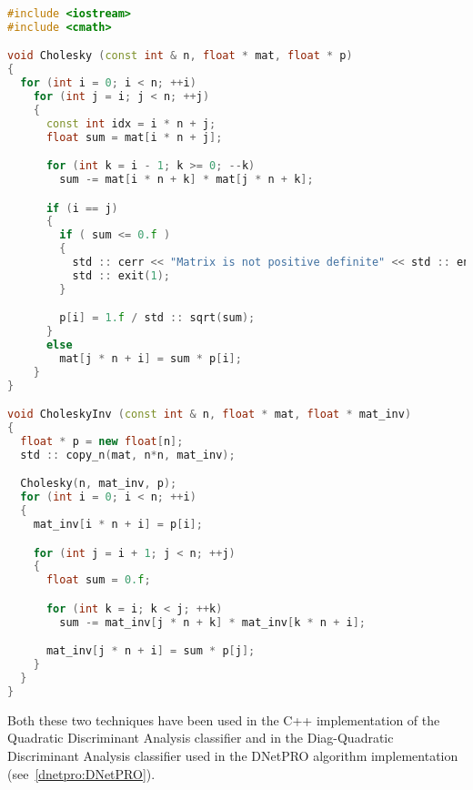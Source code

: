 \documentclass{standalone}
\begin{document}
\lstset{style=c++}
\begin{lstlisting}[language=C++, caption=Cholesky inverse matrix, label=code:cholesky]
#include <iostream>
#include <cmath>

void Cholesky (const int & n, float * mat, float * p)
{
  for (int i = 0; i < n; ++i)
    for (int j = i; j < n; ++j)
    {
      const int idx = i * n + j;
      float sum = mat[i * n + j];

      for (int k = i - 1; k >= 0; --k)
        sum -= mat[i * n + k] * mat[j * n + k];

      if (i == j)
      {
        if ( sum <= 0.f )
        {
          std :: cerr << "Matrix is not positive definite" << std :: endl;
          std :: exit(1);
        }

        p[i] = 1.f / std :: sqrt(sum);
      }
      else
        mat[j * n + i] = sum * p[i];
    }
}

void CholeskyInv (const int & n, float * mat, float * mat_inv)
{
  float * p = new float[n];
  std :: copy_n(mat, n*n, mat_inv);

  Cholesky(n, mat_inv, p);
  for (int i = 0; i < n; ++i)
  {
    mat_inv[i * n + i] = p[i];

    for (int j = i + 1; j < n; ++j)
    {
      float sum = 0.f;

      for (int k = i; k < j; ++k)
        sum -= mat_inv[j * n + k] * mat_inv[k * n + i];

      mat_inv[j * n + i] = sum * p[j];
    }
  }
}
\end{lstlisting}

Both these two techniques have been used in the \textsf{C++} implementation of the Quadratic Discriminant Analysis classifier and in the Diag-Quadratic Discriminant Analysis classifier used in the \textsf{DNetPRO} algorithm implementation (see~\ref{dnetpro:DNetPRO}).
\end{document}

